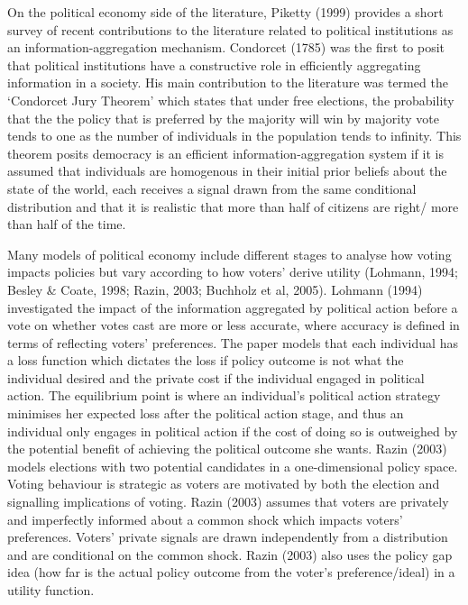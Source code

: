 \documentclass[11pt,preprint, authoryear]{elsarticle}
\numberwithin{equation}{section}
\numberwithin{figure}{section}
\numberwithin{table}{section}
\begin{document}
On the political economy side of the literature, Piketty (1999) provides
a short survey of recent contributions to the literature related to
political institutions as an information-aggregation mechanism.
Condorcet (1785) was the first to posit that political institutions have
a constructive role in efficiently aggregating information in a society.
His main contribution to the literature was termed the `Condorcet Jury
Theorem' which states that under free elections, the probability that
the the policy that is preferred by the majority will win by majority
vote tends to one as the number of individuals in the population tends
to infinity. This theorem posits democracy is an efficient
information-aggregation system if it is assumed that individuals are
homogenous in their initial prior beliefs about the state of the world,
each receives a signal drawn from the same conditional distribution and
that it is realistic that more than half of citizens are right/ more
than half of the time.

Many models of political economy include different stages to analyse how
voting impacts policies but vary according to how voters' derive utility
(Lohmann, 1994; Besley \& Coate, 1998; Razin, 2003; Buchholz et al,
2005). Lohmann (1994) investigated the impact of the information
aggregated by political action before a vote on whether votes cast are
more or less accurate, where accuracy is defined in terms of reflecting
voters' preferences. The paper models that each individual has a loss
function which dictates the loss if policy outcome is not what the
individual desired and the private cost if the individual engaged in
political action. The equilibrium point is where an individual's
political action strategy minimises her expected loss after the
political action stage, and thus an individual only engages in political
action if the cost of doing so is outweighed by the potential benefit of
achieving the political outcome she wants. Razin (2003) models elections
with two potential candidates in a one-dimensional policy space. Voting
behaviour is strategic as voters are motivated by both the election and
signalling implications of voting. Razin (2003) assumes that voters are
privately and imperfectly informed about a common shock which impacts
voters' preferences. Voters' private signals are drawn independently
from a distribution and are conditional on the common shock. Razin
(2003) also uses the policy gap idea (how far is the actual policy
outcome from the voter's preference/ideal) in a utility function.
\end{document}
